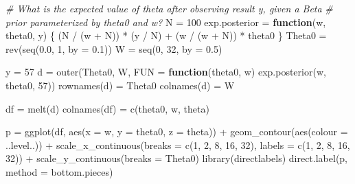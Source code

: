 \documentclass[
]{article}
\newenvironment{Shaded}{\begin{snugshade}}{\end{snugshade}}
\newcommand{\AttributeTok}[1]{\textcolor[rgb]{0.77,0.63,0.00}{#1}}
\newcommand{\CommentTok}[1]{\textcolor[rgb]{0.56,0.35,0.01}{\textit{#1}}}
\newcommand{\ControlFlowTok}[1]{\textcolor[rgb]{0.13,0.29,0.53}{\textbf{#1}}}
\newcommand{\DecValTok}[1]{\textcolor[rgb]{0.00,0.00,0.81}{#1}}
\newcommand{\FloatTok}[1]{\textcolor[rgb]{0.00,0.00,0.81}{#1}}
\newcommand{\FunctionTok}[1]{\textcolor[rgb]{0.00,0.00,0.00}{#1}}
\newcommand{\NormalTok}[1]{#1}
\newcommand{\OtherTok}[1]{\textcolor[rgb]{0.56,0.35,0.01}{#1}}
\newcommand{\SpecialCharTok}[1]{\textcolor[rgb]{0.00,0.00,0.00}{#1}}
\newcommand{\StringTok}[1]{\textcolor[rgb]{0.31,0.60,0.02}{#1}}
\begin{document}
\begin{Shaded}
\begin{Highlighting}[]
\CommentTok{\# What is the expected value of theta after observing result y, given a Beta}
\CommentTok{\# prior parameterized by theta0 and w?}
\NormalTok{N }\OtherTok{=} \DecValTok{100}
\NormalTok{exp.posterior }\OtherTok{=} \ControlFlowTok{function}\NormalTok{(w, theta0, y) \{}
\NormalTok{  (N }\SpecialCharTok{/}\NormalTok{ (w }\SpecialCharTok{+}\NormalTok{ N)) }\SpecialCharTok{*}\NormalTok{ (y }\SpecialCharTok{/}\NormalTok{ N) }\SpecialCharTok{+}\NormalTok{ (w }\SpecialCharTok{/}\NormalTok{ (w }\SpecialCharTok{+}\NormalTok{ N)) }\SpecialCharTok{*}\NormalTok{ theta0}
\NormalTok{\}}
\NormalTok{Theta0 }\OtherTok{=} \FunctionTok{rev}\NormalTok{(}\FunctionTok{seq}\NormalTok{(}\FloatTok{0.0}\NormalTok{, }\DecValTok{1}\NormalTok{, }\AttributeTok{by =} \FloatTok{0.1}\NormalTok{))}
\NormalTok{W }\OtherTok{=} \FunctionTok{seq}\NormalTok{(}\DecValTok{0}\NormalTok{, }\DecValTok{32}\NormalTok{, }\AttributeTok{by =} \FloatTok{0.5}\NormalTok{)}

\NormalTok{y }\OtherTok{=} \DecValTok{57}
\NormalTok{d }\OtherTok{=} \FunctionTok{outer}\NormalTok{(Theta0, W, }\AttributeTok{FUN =} \ControlFlowTok{function}\NormalTok{(theta0, w) }\FunctionTok{exp.posterior}\NormalTok{(w, theta0, }\DecValTok{57}\NormalTok{))}
\FunctionTok{rownames}\NormalTok{(d) }\OtherTok{=}\NormalTok{ Theta0}
\FunctionTok{colnames}\NormalTok{(d) }\OtherTok{=}\NormalTok{ W}

\NormalTok{df }\OtherTok{=} \FunctionTok{melt}\NormalTok{(d)}
\FunctionTok{colnames}\NormalTok{(df) }\OtherTok{=} \FunctionTok{c}\NormalTok{(}\StringTok{\textquotesingle{}theta0\textquotesingle{}}\NormalTok{, }\StringTok{\textquotesingle{}w\textquotesingle{}}\NormalTok{, }\StringTok{\textquotesingle{}theta\textquotesingle{}}\NormalTok{)}

\NormalTok{p }\OtherTok{=} \FunctionTok{ggplot}\NormalTok{(df, }\FunctionTok{aes}\NormalTok{(}\AttributeTok{x =}\NormalTok{ w, }\AttributeTok{y =}\NormalTok{ theta0, }\AttributeTok{z =}\NormalTok{ theta)) }\SpecialCharTok{+}
  \FunctionTok{geom\_contour}\NormalTok{(}\FunctionTok{aes}\NormalTok{(}\AttributeTok{colour =}\NormalTok{ ..level..)) }\SpecialCharTok{+}
  \FunctionTok{scale\_x\_continuous}\NormalTok{(}\AttributeTok{breaks =} \FunctionTok{c}\NormalTok{(}\DecValTok{1}\NormalTok{, }\DecValTok{2}\NormalTok{, }\DecValTok{8}\NormalTok{, }\DecValTok{16}\NormalTok{, }\DecValTok{32}\NormalTok{), }\AttributeTok{labels =} \FunctionTok{c}\NormalTok{(}\DecValTok{1}\NormalTok{, }\DecValTok{2}\NormalTok{, }\DecValTok{8}\NormalTok{, }\DecValTok{16}\NormalTok{, }\DecValTok{32}\NormalTok{)) }\SpecialCharTok{+}
  \FunctionTok{scale\_y\_continuous}\NormalTok{(}\AttributeTok{breaks =}\NormalTok{ Theta0)}
\FunctionTok{library}\NormalTok{(directlabels)}
\FunctionTok{direct.label}\NormalTok{(p, }\AttributeTok{method =} \StringTok{\textquotesingle{}bottom.pieces\textquotesingle{}}\NormalTok{)}
\end{Highlighting}
\end{Shaded}
\end{document}
